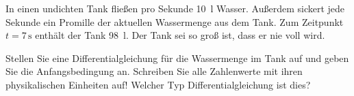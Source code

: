 \item{In einen undichten Tank fließen pro Sekunde 10~l Wasser. Außerdem sickert jede Sekunde ein Promille der aktuellen Wassermenge aus dem Tank. Zum Zeitpunkt $t=7\,\mbox{s}$ enthält der Tank 98~l. Der Tank sei so groß ist, dass er nie voll wird.

Stellen Sie eine Differentialgleichung für die Wassermenge im Tank auf und geben Sie die Anfangsbedingung an. Schreiben Sie alle Zahlenwerte mit ihren physikalischen Einheiten auf! Welcher Typ Differentialgleichung ist dies?}
